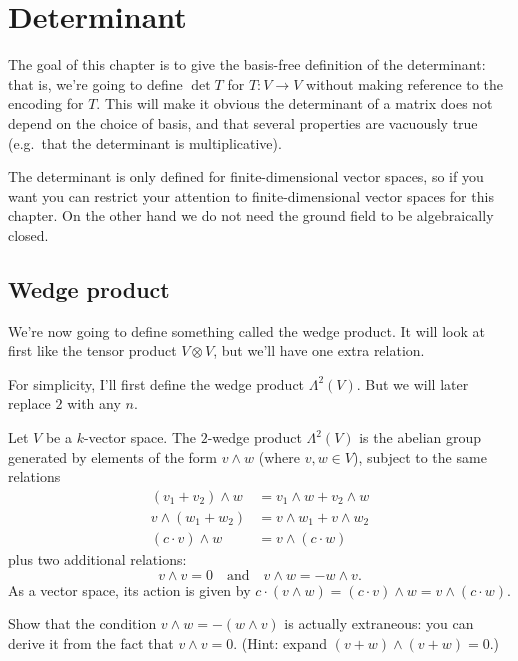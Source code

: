 \chapter{Determinant}
The goal of this chapter is to give the basis-free
definition of the determinant:
that is, we're going to define $\det T$
for $T \colon V \to V$ without making reference to the encoding for $T$.
This will make it obvious the determinant of a matrix
does not depend on the choice of basis,
and that several properties are vacuously true
(e.g.\ that the determinant is multiplicative).

The determinant is only defined for finite-dimensional
vector spaces, so if you want you can restrict
your attention to finite-dimensional vector spaces for this chapter.
On the other hand we do not need the
ground field to be algebraically closed.

\section{Wedge product}
We're now going to define something called the wedge product.
It will look at first like the tensor product $V \otimes V$,
but we'll have one extra relation.

For simplicity, I'll first define the wedge product $\Lambda^2(V)$.
But we will later replace $2$ with any $n$.

\begin{definition}
	Let $V$ be a $k$-vector space.
	The $2$-wedge product $\Lambda^2(V)$ is the abelian group
	generated by elements of the form $v \wedge w$ (where $v,w \in V$),
	subject to the same relations
	\begin{align*}
		(v_1 + v_2) \wedge w &= v_1 \wedge w + v_2 \wedge w \\
		v \wedge (w_1 + w_2) &= v \wedge w_1 + v \wedge w_2 \\
		(c \cdot v) \wedge w &= v \wedge (c \cdot w)
	\end{align*}
	plus two additional relations:
	\[ v \wedge v = 0 \quad\text{and}\quad
		v \wedge w = - w \wedge v. \]
	As a vector space, its action is given by
	$c \cdot (v \wedge w) = (c \cdot v) \wedge w = v \wedge (c \cdot w)$.
\end{definition}
\begin{exercise}
	Show that the condition $v \wedge w = - (w \wedge v)$
	is actually extraneous:
	you can derive it from the fact that $v \wedge v = 0$.
	(Hint: expand $(v + w) \wedge (v + w) = 0$.)
\end{exercise}

